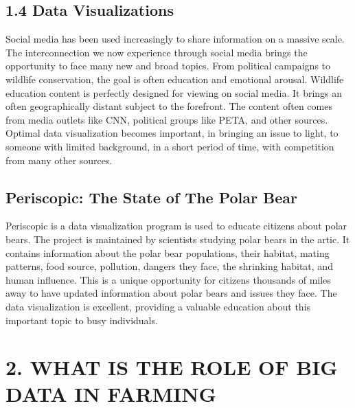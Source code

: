 \documentclass[sigconf]{acmart}
\begin{document}
\subsection{1.4	Data Visualizations}
Social media has been used increasingly to share information on a massive scale. The interconnection we now experience through social media brings the opportunity to face many new and broad topics.  From political campaigns to wildlife conservation, the goal is often education and emotional arousal. Wildlife education content is perfectly designed for viewing on social media.  It brings an often geographically distant subject to the forefront.  The content often comes from media outlets like CNN, political groups like PETA, and other sources.  Optimal data visualization becomes important, in bringing an issue to light, to someone with limited background, in a short period of time, with competition from many other sources.  
\subsection{    Periscopic: The State of The Polar Bear}
Periscopic is a data visualization program is used to educate citizens about polar bears.  The project is maintained by scientists studying polar bears in the artic.  It contains information about the polar bear populations, their habitat, mating patterns, food source, pollution, dangers they face, the shrinking habitat, and human influence.  This is a unique opportunity for citizens thousands of miles away to have updated information about polar bears and issues they face.  The data visualization is excellent, providing a valuable education about this important topic to busy individuals.        



\section{2.	WHAT IS THE ROLE OF BIG DATA IN FARMING}
\end{document}
